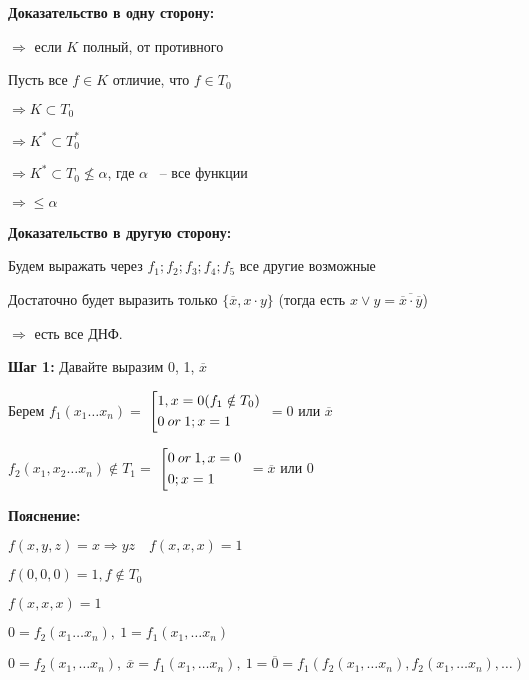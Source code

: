 \documentclass[russian]{lecture-notes}
\begin{document}
    \textbf{Доказательство в одну сторону:}

    $\Rightarrow$ если $K$ полный, от противного

    Пусть все $f \in K$ отличие, что
    $f \in T_0$

    $ \Rightarrow K \subset T_0$

    $\Rightarrow K^* \subset T^*_0$

    $\Rightarrow K^* \subset T_0 \nleq \alpha$, где $\alpha$ ~-- все функции

    $\Rightarrow \leq \alpha$

    \textbf{Доказательство в другую сторону:}

    Будем выражать через $f_1; f_2; f_3; f_4; f_5$ все другие возможные

    Достаточно будет выразить только $\{ \overline{x}, x \cdot y\}$ (тогда есть $x \lor y = \overline{\overline{x} \cdot \overline{y}}$)

    $\Rightarrow$ есть все ДНФ.

    \textbf{Шаг 1:}
    Давайте выразим 0, 1, $\overline{x}$

    Берем $f_1(x_1 \dots x_n) = $
    $\left[
    \begin{gathered}
        1, x = 0 (f_1 \notin T_0) \hfill
        \\
        0 \: or \: 1; x = 1 \hfill
        \\
    \end{gathered}
    \right.$
    $ = 0$ или $\overline{x}$

    $f_2(x_1, x_2 \dots x_n) \notin T_1 = $
    $\left[
    \begin{gathered}
        0 \: or \: 1, x = 0 \hfill
        \\
        0; x = 1 \hfill
        \\
    \end{gathered}
    \right.$
    $ = \overline{x}$ или $0$

    \textbf{Пояснение:}

    $f(x, y, z) = x \Rightarrow yz \quad f(x, x, x) = 1$

    $f(0, 0, 0) = 1, f \notin T_0$

    $f(x, x, x) = 1$

    $0 = f_2(x_1 \dots x_n), \: 1 =    f_1(x_1, \dots x_n)$

    $0 = f_2(x_1, \dots x_n), \: \overline{x} = f_1(x_1, \dots x_n), \: 1 = \overline{0} = f_1(f_2(x_1, \dots x_n), f_2(x_1, \dots x_n), \dots) $
\end{document}
